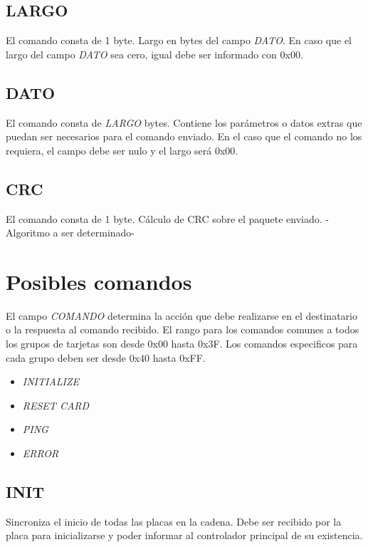 \documentclass[a4paper,11pt]{article}
\begin{document}
\subsection{LARGO}
\label{largo}

	El comando consta de 1 byte.
	Largo en bytes del campo \emph{DATO}.
	En caso que el largo del campo \emph{DATO} sea cero, igual debe ser informado con 0x00.

\subsection{DATO}
\label{dato}

	El comando consta de \emph{LARGO} bytes.
	Contiene los par\'ametros o datos extras que puedan ser necesarios para el comando enviado.
	En el caso que el comando no los requiera, el campo debe ser nulo y el largo ser\'a 0x00.

\subsection{CRC}
\label{crc}

	El comando consta de 1 byte.
	C\'alculo de CRC sobre el paquete enviado.
	-Algoritmo a ser determinado-

\section{Posibles comandos}
\label{comandos}

El campo \emph{COMANDO} determina la acci\'on que debe realizarse en el destinatario o la respuesta al comando recibido.
El rango para los comandos comunes a todos los grupos de tarjetas son desde 0x00 hasta 0x3F.
Los comandos especificos para cada grupo deben ser desde 0x40 hasta 0xFF.

\begin{itemize}
	\item \emph{INITIALIZE}
	\item \emph{RESET CARD}
	\item \emph{PING}
	\item \emph{ERROR}
\label{lista_comandos}
\end{itemize}

\subsection{INIT}
\label{init}

Sincroniza el inicio de todas las placas en la cadena.
Debe ser recibido por la placa para inicializarse y poder informar al controlador principal de su existencia.
\end{document}
